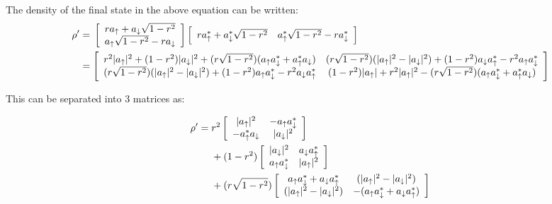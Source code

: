 \documentclass[english]{article}
\DeclarePairedDelimiter\abs{\lvert}{\rvert}
\begin{document}
The density of the final state in the above equation can be written:
\begin{equation}\label{eq:finalstate-densitymatrix}
\begin{aligned}
\rho^{\prime} & = {} \left[\begin{array}{c}ra_{\uparrow} + a_{\downarrow}\sqrt{1 - r^{2}} \\ a_{\uparrow}\sqrt{1 - r^{2}} - ra_{\downarrow} \end{array}\right] \left[\begin{array}{cc}ra_{\uparrow}^{*} + a_{\downarrow}^{*}\sqrt{1 - r^{2}} & a_{\uparrow}^{*}\sqrt{1 - r^{2}} - ra_{\downarrow}^{*} \end{array}\right] \\
& = \left[\begin{array}{cc} r^{2}\abs{a_{\uparrow}}^2+(1-r^{2})\abs{a_{\downarrow}}^{2}+(r\sqrt{1-r^{2}})(a_{\uparrow}a_{\downarrow}^{*}+a_{\uparrow}^{*}a_{\downarrow}) & (r\sqrt{1-r^{2}})(\abs{a_{\uparrow}}^{2} - \abs{a_{\downarrow}}^{2})+(1-r^{2})a_{\downarrow}a_{\uparrow}^{*}-r^{2}a_{\uparrow}a_{\downarrow}^{*} \\
(r\sqrt{1-r^{2}})(\abs{a_{\uparrow}}^{2} - \abs{a_{\downarrow}}^{2})+(1-r^{2})a_{\uparrow}a_{\downarrow}^{*}-r^{2}a_{\downarrow}a_{\uparrow}^{*} & (1-r^{2})\abs{a_{\uparrow}}+ r^{2}\abs{a_{\uparrow}}^2-(r\sqrt{1-r^{2}})(a_{\uparrow}a_{\downarrow}^{*}+a_{\uparrow}^{*}a_{\downarrow})
  \end{array}\right]
\end{aligned}
\end{equation}

This can be separated into 3 matrices as:

\begin{equation}
  \begin{aligned}
  \rho^{\prime} = {} & r^{2} \left[\begin{array}{cc}\abs{a_{\uparrow}}^{2} & -a_{\uparrow}a_{\downarrow}^{*} \\
               -a_{\uparrow}^{*}a_{\downarrow} & \abs{a_{\downarrow}}^{2} \end{array} \right] \\
  & + (1-r^{2})\left[\begin{array}{cc}\abs{a_{\downarrow}}^{2} & a_{\downarrow}a_{\uparrow}^{*} \\
               a_{\uparrow}a_{\downarrow}^{*} & \abs{a_{\uparrow}}^{2} \end{array} \right] \\
  & + (r\sqrt{1-r^{2}})\left[\begin{array}{cc}a_{\uparrow}a_{\downarrow}^{*}+a_{\downarrow}a_{\uparrow}^{*} & (\abs{a_{\uparrow}}^{2}-\abs{a_{\downarrow}}^{2}) \\
             (\abs{a_{\uparrow}}^{2}-\abs{a_{\downarrow}}^{2}) & -(a_{\uparrow}a_{\downarrow}^{*}+a_{\downarrow}a_{\uparrow}^{*})\end{array} \right]
  \end{aligned}
\end{equation}
\end{document}

